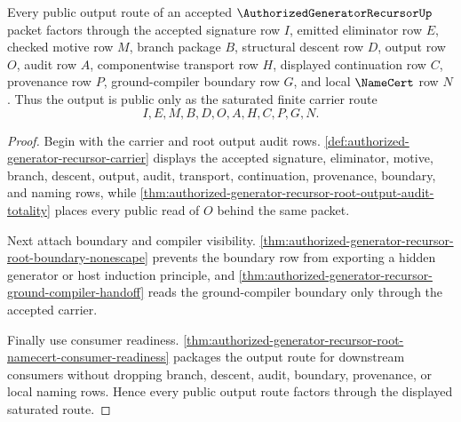 \begin{theorem}
\label{thm:authorized-generator-recursor-root-output-route-saturation}
Every public output route of an accepted $\AuthorizedGeneratorRecursorUp$ packet factors through the accepted signature row $I$, emitted eliminator row $E$, checked motive row $M$, branch package $B$, structural descent row $D$, output row $O$, audit row $A$, componentwise transport row $H$, displayed continuation row $C$, provenance row $P$, ground-compiler boundary row $G$, and local $\NameCert$ row $N$. Thus the output is public only as the saturated finite carrier route
$$
I,E,M,B,D,O,A,H,C,P,G,N.
$$
\end{theorem}
\begin{proof}
Begin with the carrier and root output audit rows. \autoref{def:authorized-generator-recursor-carrier} displays the accepted signature, eliminator, motive, branch, descent, output, audit, transport, continuation, provenance, boundary, and naming rows, while \autoref{thm:authorized-generator-recursor-root-output-audit-totality} places every public read of $O$ behind the same packet.

Next attach boundary and compiler visibility. \autoref{thm:authorized-generator-recursor-root-boundary-nonescape} prevents the boundary row from exporting a hidden generator or host induction principle, and \autoref{thm:authorized-generator-recursor-ground-compiler-handoff} reads the ground-compiler boundary only through the accepted carrier.

Finally use consumer readiness. \autoref{thm:authorized-generator-recursor-root-namecert-consumer-readiness} packages the output route for downstream consumers without dropping branch, descent, audit, boundary, provenance, or local naming rows. Hence every public output route factors through the displayed saturated route.
\end{proof}


